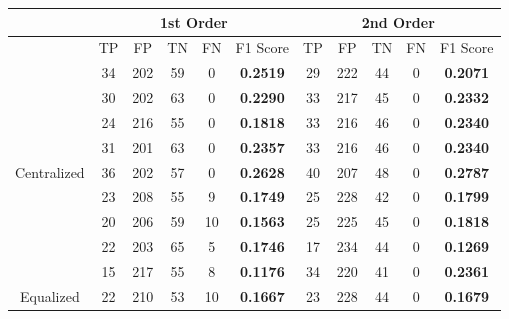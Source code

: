 \documentclass[10pt,a4paper]{article}
\begin{document}
		\begin{table}[!h]
			\centering
			\begin{tabular}{|c|c|c|c|c|c|c|c|c|c|c|}
				\hline
				& \multicolumn{5}{c|}{1st Order}                                                     & \multicolumn{5}{c|}{2nd Order}                              \\ \hline
				& TP & FP  & TN & FN                        & F1 Score                               & TP & FP  & TN & FN & F1 Score                               \\ \hline
				& 34 & 202 & 59 & {\color[HTML]{333333} 0}  & {\color[HTML]{FE0000} \textbf{0.2519}} & 29 & 222 & 44 & 0  & {\color[HTML]{FE0000} \textbf{0.2071}} \\ \cline{2-11} 
				& 30 & 202 & 63 & {\color[HTML]{333333} 0}  & {\color[HTML]{FE0000} \textbf{0.2290}} & 33 & 217 & 45 & 0  & {\color[HTML]{FE0000} \textbf{0.2332}} \\ \cline{2-11} 
				& 24 & 216 & 55 & {\color[HTML]{333333} 0}  & {\color[HTML]{FE0000} \textbf{0.1818}} & 33 & 216 & 46 & 0  & {\color[HTML]{FE0000} \textbf{0.2340}} \\ \cline{2-11} 
				& 31 & 201 & 63 & {\color[HTML]{333333} 0}  & {\color[HTML]{FE0000} \textbf{0.2357}} & 33 & 216 & 46 & 0  & {\color[HTML]{FE0000} \textbf{0.2340}} \\ \cline{2-11} 
				\multirow{-5}{*}{Centralized} & 36 & 202 & 57 & {\color[HTML]{333333} 0}  & {\color[HTML]{FE0000} \textbf{0.2628}} & 40 & 207 & 48 & 0  & {\color[HTML]{FE0000} \textbf{0.2787}} \\ \hline
				& 23 & 208 & 55 & {\color[HTML]{333333} 9}  & {\color[HTML]{FE0000} \textbf{0.1749}} & 25 & 228 & 42 & 0  & {\color[HTML]{FE0000} \textbf{0.1799}} \\ \cline{2-11} 
				& 20 & 206 & 59 & {\color[HTML]{333333} 10} & {\color[HTML]{FE0000} \textbf{0.1563}} & 25 & 225 & 45 & 0  & {\color[HTML]{FE0000} \textbf{0.1818}} \\ \cline{2-11} 
				& 22 & 203 & 65 & {\color[HTML]{333333} 5}  & {\color[HTML]{FE0000} \textbf{0.1746}} & 17 & 234 & 44 & 0  & {\color[HTML]{FE0000} \textbf{0.1269}} \\ \cline{2-11} 
				& 15 & 217 & 55 & {\color[HTML]{333333} 8}  & {\color[HTML]{FE0000} \textbf{0.1176}} & 34 & 220 & 41 & 0  & {\color[HTML]{FE0000} \textbf{0.2361}} \\ \cline{2-11} 
				\multirow{-5}{*}{Equalized}   & 22 & 210 & 53 & {\color[HTML]{333333} 10} & {\color[HTML]{FE0000} \textbf{0.1667}} & 23 & 228 & 44 & 0  & {\color[HTML]{FE0000} \textbf{0.1679}} \\ \hline
			\end{tabular}
		\end{table}
	
\end{document}

